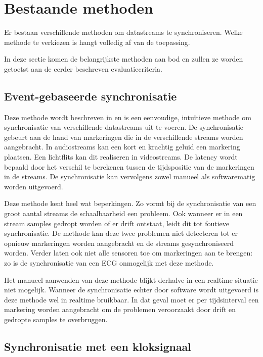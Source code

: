 \section{Bestaande methoden}

Er bestaan verschillende methoden om datastreams te synchroniseren. Welke methode te verkiezen is hangt volledig af van de toepassing.

In deze sectie komen de belangrijkste methoden aan bod en zullen ze worden getoetst aan de eerder beschreven evaluatiecriteria. 

\subsection{Event-gebaseerde synchronisatie}

Deze methode wordt beschreven in \cite{bannach2009automatic, six2015multimodal} en is een eenvoudige, intuïtieve methode om synchronisatie van verschillende datastreams uit te voeren. De synchronisatie gebeurt aan de hand van markeringen die in de verschillende streams worden aangebracht. In audiostreams kan een kort en krachtig geluid een markering plaatsen. Een lichtflits kan dit realiseren in videostreams. De latency wordt bepaald door het verschil te berekenen tussen de tijdspositie van de markeringen in de streams. De synchronisatie kan vervolgens zowel manueel als softwarematig worden uitgevoerd.

Deze methode kent heel wat beperkingen. Zo vormt bij de synchronisatie van een groot aantal streams de schaalbaarheid een probleem. Ook wanneer er in een stream samples gedropt worden of er drift ontstaat, leidt dit tot foutieve synchronisatie. De methode kan deze twee problemen niet detecteren tot er opnieuw markeringen worden aangebracht en de streams gesynchroniseerd worden. Verder laten ook niet alle sensoren toe om markeringen aan te brengen: zo is de synchronisatie van een ECG onmogelijk met deze methode.

Het manueel aanwenden van deze methode blijkt derhalve in een realtime situatie niet mogelijk.  Wanneer de synchronisatie echter door software wordt uitgevoerd is deze methode wel in realtime bruikbaar. In dat geval moet er per tijdsinterval een markering worden aangebracht om de problemen veroorzaakt door drift en gedropte samples te overbruggen.

\subsection{Synchronisatie met een kloksignaal}

